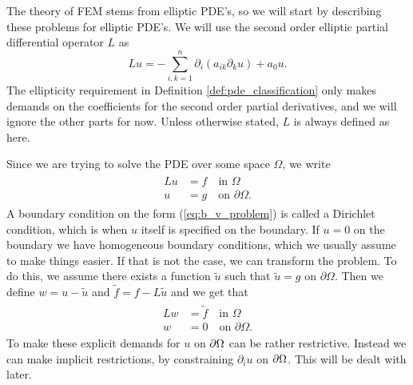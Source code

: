 \iffalse 
\section{Boundary or Initial Value Problems}
When working with ODE's,
whether a problem explicitly states the boundary conditions 
or the initial values does not affect whether a problem can be solved.
When working with 
PDE's that is no longer the case. The different types 
of PDE's demand differently posed problems. 


----THE ABOVE\@: SKAL DET OVERHOVEDET MED?----
\fi

The theory of FEM stems from elliptic PDE's, so we will start by
describing these problems for elliptic PDE's.
We will use the second order elliptic partial differential operator $L$ as 
\begin{equation}
    Lu = - \sum_{i,k=1}^n \partial_i(a_{ik} \partial_k u)+ a_0u.
    \label{eq:Lu}
\end{equation}
The ellipticity requirement in Definition \ref{def:pde_classification} only 
makes demands on the coefficients for the second order partial derivatives, 
and we will ignore the other parts for now. Unless otherwise stated, $L$ is 
always defined as here.
\iffalse
We therefore assume that we can write a general linear PDE of second 
order with $n$ variables as 
\begin{equation*}
    Lu = f.
\end{equation*}
\fi
Since we are trying to solve the PDE over some space $\Omega$, we write
\begin{align}
\begin{split}
    Lu &= f \quad \text{in } \Omega \label{eq:b_v_problem} \\
    u &= g \quad \text{on } \partial \Omega.
\end{split}
\end{align}
A boundary condition on the form (\ref{eq:b_v_problem}) is called a 
Dirichlet condition, which is when $u$ itself is specified on the boundary. 
If $u=0$ on the boundary we have homogeneous boundary conditions, which we usually assume 
to make things easier. If that is not the case, we can
transform the problem. To do this, we assume there exists a function 
$\tilde{u}$ such that $\tilde{u}=g$ on $\partial \Omega$. Then we define 
$w = u - \tilde{u}$ and $\tilde{f}=f-L\tilde{u}$ and we get that
\begin{align}
\begin{split}
    Lw &= \tilde{f} \quad \text{in } \Omega \label{eq:b_v_problem_homogeneous} \\
    w &= 0 \quad \text{on } \partial \Omega. 
\end{split}
\end{align}
To make these explicit demands for $u$ on $\partial \Omega$ can 
be rather restrictive.
Instead we can make implicit restrictions, by constraining 
$\partial _i u$ on $\partial \Omega$.
This will be dealt with later.

